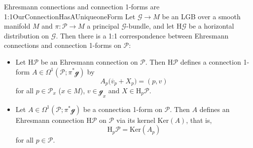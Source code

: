 \documentclass[reqno,a4paper,oneside]{amsart}
\theoremstyle{plain}
\theoremstyle{remark}
\theoremstyle{definition}
\begin{document}
\begin{theorems}{Ehresmann connections and connection 1-forms are 1:1}{OurConnectionHasAUniqueoneForm}
Let $\mathcal{G} \to M$ be an LGB over a smooth manifold $M$ and $\pi\colon\mathcal{P} \to M$ a principal $\mathcal{G}$-bundle, and let $\mathrm{H}\mathcal{G}$ be a horizontal distribution on $\mathcal{G}$. Then there is a 1:1 correspondence between Ehresmann connections and connection 1-forms on $\mathcal{P}$:
\begin{itemize}
	\item Let $\mathrm{H}\mathcal{P}$ be an Ehresmann connection on $\mathcal{P}$. Then $\mathrm{H}\mathcal{P}$ defines a connection 1-form $A \in \Omega^1(\mathcal{P}; \pi^*\mathcal{g})$ by
	\begin{equation*}
	A_p\bigl( \overline{v}_p + X_p \bigr)
	=
	(p, v)
	\end{equation*}
	for all $p \in \mathcal{P}_x$ ($x \in M$), $v \in \mathcal{g}_x$ and $X \in \mathrm{H}_p\mathcal{P}$.
	\item Let $A \in \Omega^1(\mathcal{P}; \pi^*\mathcal{g})$ be a connection 1-form on $\mathcal{P}$. Then $A$ defines an Ehresmann connection $\mathrm{H}\mathcal{P}$ on $\mathcal{P}$ via its kernel $\mathrm{Ker}(A)$, that is,
	\begin{equation*}
	\mathrm{H}_p\mathcal{P}
	=
	\mathrm{Ker}(A_p)
	\end{equation*}
	for all $p \in \mathcal{P}$.
\end{itemize}
\end{theorems}
\end{document}
